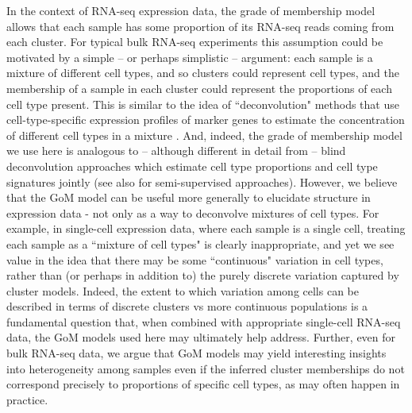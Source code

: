 

In the context of RNA-seq expression data, the grade of membership model allows that each
 sample has some proportion of its RNA-seq reads coming from each cluster. For typical bulk RNA-seq experiments this assumption 
could be motivated by a simple -- or perhaps simplistic -- argument: each sample is a mixture of different cell types, and so clusters 
could represent cell types, and the membership of a sample in each cluster could represent the proportions of each cell type present.
This is similar to the idea of ``deconvolution" methods that use cell-type-specific expression profiles of marker genes to estimate the concentration of different cell types in a mixture \cite{Lindsay2013}. And, indeed, the grade of membership model we use here is analogous to -- although different in detail from -- 
blind deconvolution approaches \cite{Schwartz2010,Repsilber2010}
 which estimate cell type proportions and cell type signatures jointly (see also \cite{Shen-Orr2010,Qiao2012} for semi-supervised approaches). 
However, we believe that the GoM model can be useful more generally to elucidate structure in expression data - not only as a way to deconvolve 
mixtures of cell types. For example, in single-cell expression data, where each sample is a single cell, 
treating each sample as a ``mixture of cell types" is clearly inappropriate, and yet we see value in the idea
that there may be some ``continuous" variation in cell types, rather than (or perhaps in addition to) the purely discrete variation captured by cluster models. 
Indeed, the extent to which variation among cells can be described in terms of discrete clusters vs more continuous populations
is a fundamental question that, when combined with appropriate single-cell RNA-seq data, the GoM models used here may
ultimately help address. Further, even for bulk RNA-seq data, we argue that GoM models may yield interesting insights into heterogeneity among samples
even if the inferred cluster memberships do not correspond precisely to proportions of specific cell types, as may often happen in practice.

